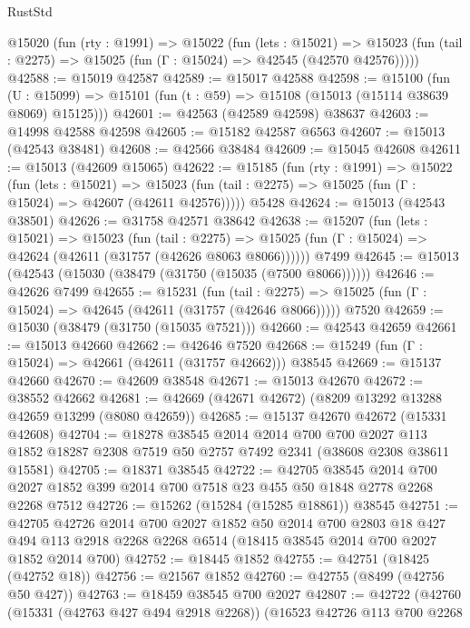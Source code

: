 \begin{lexlean}{RustStd}
\begin{coremodule}
  @15020
    (fun (rty : @1991) =>
    @15022
      (fun (lets : @15021) =>
      @15023 (fun (tail : @2275) => @15025 (fun (Γ : @15024) => @42545 (@42570 @42576)))))
@42588 := @15019 @42587
@42589 := @15017 @42588
@42598 := @15100
    (fun (U : @15099) => @15101 (fun (t : @59) => @15108 (@15013 (@15114 @38639 @8069) @15125)))
@42601 := @42563 (@42589 @42598) @38637
@42603 := @14998 @42588 @42598
@42605 := @15182 @42587 @6563
@42607 := @15013 (@42543 @38481)
@42608 := @42566 @38484
@42609 := @15045 @42608
@42611 := @15013 (@42609 @15065)
@42622 := @15185
    (fun (rty : @1991) =>
    @15022
      (fun (lets : @15021) =>
      @15023 (fun (tail : @2275) => @15025 (fun (Γ : @15024) => @42607 (@42611 @42576)))))
    @5428
@42624 := @15013 (@42543 @38501)
@42626 := @31758 @42571 @38642
@42638 := @15207
    (fun (lets : @15021) =>
    @15023
      (fun (tail : @2275) =>
      @15025 (fun (Γ : @15024) => @42624 (@42611 (@31757 (@42626 @8063 @8066))))))
    @7499
@42645 := @15013 (@42543 (@15030 (@38479 (@31750 (@15035 (@7500 @8066))))))
@42646 := @42626 @7499
@42655 := @15231
    (fun (tail : @2275) => @15025 (fun (Γ : @15024) => @42645 (@42611 (@31757 (@42646 @8066)))))
    @7520
@42659 := @15030 (@38479 (@31750 (@15035 @7521)))
@42660 := @42543 @42659
@42661 := @15013 @42660
@42662 := @42646 @7520
@42668 := @15249 (fun (Γ : @15024) => @42661 (@42611 (@31757 @42662))) @38545
@42669 := @15137 @42660
@42670 := @42609 @38548
@42671 := @15013 @42670
@42672 := @38552 @42662
@42681 := @42669 (@42671 @42672) (@8209 @13292 @13288 @42659 @13299 (@8080 @42659))
@42685 := @15137 @42670 @42672 (@15331 @42608)
@42704 := @18278
    @38545
    @2014
    @2014
    @700
    @700
    @2027
    @113
    @1852
    @18287
    @2308
    @7519
    @50
    @2757
    @7492
    @2341
    (@38608 @2308 @38611 @15581)
@42705 := @18371 @38545
@42722 := @42705
    @38545
    @2014
    @700
    @2027
    @1852
    @399
    @2014
    @700
    @7518
    @23
    @455
    @50
    @1848
    @2778
    @2268
    @2268
    @7512
@42726 := @15262 (@15284 (@15285 @18861)) @38545
@42751 := @42705
    @42726
    @2014
    @700
    @2027
    @1852
    @50
    @2014
    @700
    @2803
    @18
    @427
    @494
    @113
    @2918
    @2268
    @2268
    @6514
    (@18415 @38545 @2014 @700 @2027 @1852 @2014 @700)
@42752 := @18445 @1852
@42755 := @42751 (@18425 (@42752 @18))
@42756 := @21567 @1852
@42760 := @42755 (@8499 (@42756 @50 @427))
@42763 := @18459 @38545 @700 @2027
@42807 := @42722
    (@42760
      (@15331 (@42763 @427 @494 @2918 @2268))
      (@16523
        @42726
        @113
        @700
        @2268

\end{coremodule}
\end{lexlean}
